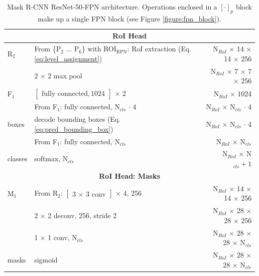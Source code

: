 {\begin{table}[h]
\begin{tabular}{llr}
\multicolumn{3}{c}{\textbf{RoI Head}}\\
\midrule
R$_2$ & From \{P$_2$ ... P$_6$\} with ROI$_{\mathrm{RPN}}$: RoI extraction (Eq. \ref{eq:level_assignment}) & N$_{RoI}$ $\times$ 14 $\times$ 14 $\times$ 256 \\
& 2 $\times$ 2 max pool & N$_{RoI}$ $\times$ 7 $\times$ 7 $\times$ 256 \\
F$_1$ & $\begin{bmatrix}\textrm{fully connected}, 1024\end{bmatrix}$ $\times$ 2 & N$_{RoI}$ $\times$ 1024 \\
& From F$_1$: fully connected, N$_{cls}$ $\cdot$ 4 & N$_{RoI}$ $\times$ N$_{cls}$ $\cdot$ 4 \\
boxes & decode bounding boxes (Eq. \ref{eq:pred_bounding_box}) & N$_{RoI}$ $\times$ N$_{cls}$ $\cdot$ 4\\
& From F$_1$: fully connected, N$_{cls}$ & N$_{RoI}$ $\times$ N$_{cls}$ \\
classes& softmax, N$_{cls}$ & N$_{RoI}$ $\times$ N$_{cls} + 1$ \\
\midrule
\multicolumn{3}{c}{\textbf{RoI Head: Masks}}\\
\midrule
M$_1$ & From R$_2$: $\begin{bmatrix}\textrm{3 $\times$ 3 conv} \end{bmatrix}$ $\times$ 4, 256 & N$_{RoI}$ $\times$ 14 $\times$ 14 $\times$ 256 \\
& 2 $\times$ 2 deconv, 256, stride 2 & N$_{RoI}$ $\times$ 28 $\times$ 28 $\times$ 256 \\
& 1 $\times$ 1 conv, N$_{cls}$ & N$_{RoI}$ $\times$ 28 $\times$ 28 $\times$ N$_{cls}$ \\
masks & sigmoid & N$_{RoI}$ $\times$ 28 $\times$ 28 $\times$ N$_{cls}$ \\
\bottomrule
\end{tabular}
\caption {
Mask R-CNN \cite{MaskRCNN} ResNet-50-FPN \cite{ResNet} architecture.
Operations enclosed in a $[\cdot]_p$ block make up a single FPN
block (see Figure \ref{figure:fpn_block}).
}
\label{table:maskrcnn_resnet_fpn}
\end{table}
}


